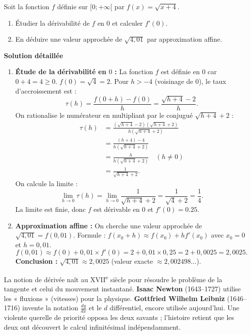 \documentclass[11pt]{article}
\begin{document}
\begin{exoresolu}
Soit la fonction $f$ définie sur $[0; +\infty[$ par $f(x) = \sqrt{x+4}$.
\begin{enumerate}
    \item Étudier la dérivabilité de $f$ en $0$ et calculer $f'(0)$.
    \item En déduire une valeur approchée de $\sqrt{4,01}$ par approximation affine.
\end{enumerate}
\tcblower
\textbf{Solution détaillée}
\begin{enumerate}
    \item \textbf{Étude de la dérivabilité en $0$ :}
    La fonction $f$ est définie en $0$ car $0+4=4 \ge 0$. $f(0) = \sqrt{4} = 2$.
    Pour $h > -4$ (voisinage de $0$), le taux d'accroissement est :
    \[
    \tau(h) = \frac{f(0+h)-f(0)}{h} = \frac{\sqrt{h+4} - 2}{h}.
    \]
    On rationalise le numérateur en multipliant par le conjugué $\sqrt{h+4}+2$ :
    \begin{align*}
    \tau(h) &= \frac{(\sqrt{h+4} - 2)(\sqrt{h+4}+2)}{h(\sqrt{h+4}+2)} \\
    &= \frac{(h+4) - 4}{h(\sqrt{h+4}+2)} \\
    &= \frac{h}{h(\sqrt{h+4}+2)} \quad (h \neq 0) \\
    &= \frac{1}{\sqrt{h+4}+2}.
    \end{align*}
    On calcule la limite :
    \[
    \lim_{h \to 0} \tau(h) = \lim_{h \to 0} \frac{1}{\sqrt{h+4}+2} = \frac{1}{\sqrt{4}+2} = \frac{1}{4}.
    \]
    La limite est finie, donc $f$ est dérivable en $0$ et \textbf{$f'(0) = \num{0,25}$}.
    
    \item \textbf{Approximation affine :}
    On cherche une valeur approchée de $\sqrt{4,01} = f(0,01)$.
    Formule : $f(x_0+h) \approx f(x_0) + h f'(x_0)$ avec $x_0=0$ et $h=0,01$.
    \[
    f(0,01) \approx f(0) + 0,01 \times f'(0) = 2 + 0,01 \times 0,25 = 2 + 0,0025 = 2,0025.
    \]
    \textbf{Conclusion :} $\sqrt{4,01} \approx 2,0025$ (valeur exacte $\approx 2,002498\dots$).
\end{enumerate}
\end{exoresolu}

\begin{savaistu}
La notion de dérivée naît au XVII\textsuperscript{e} siècle pour résoudre le problème de la tangente et celui du mouvement instantané. \textbf{Isaac Newton} (1643--1727) utilise les « fluxions » (vitesses) pour la physique. \textbf{Gottfried Wilhelm Leibniz} (1646--1716) invente la notation $\frac{dy}{dx}$ et le $d$ différentiel, encore utilisée aujourd'hui. Une violente querelle de priorité opposa les deux savants ; l'histoire retient que les deux ont découvert le calcul infinitésimal indépendamment.
\end{savaistu}
\end{document}
